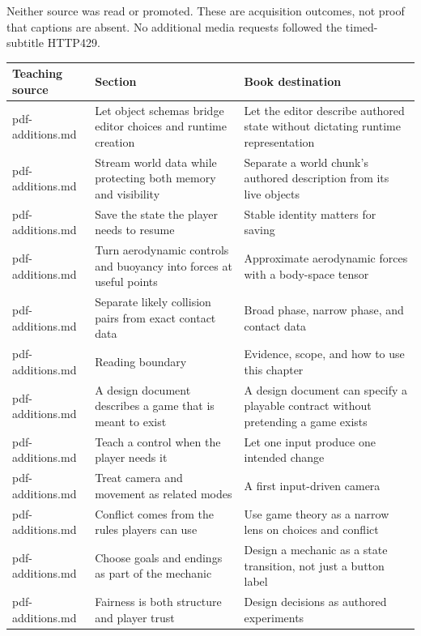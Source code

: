 Neither source was read or promoted. These are acquisition outcomes, not proof that captions are absent. No additional media requests followed the timed-subtitle HTTP429.

{\def\LTcaptype{none} %
\begin{longtable}[]{@{}
  >{\raggedright\arraybackslash}p{}
  >{\raggedright\arraybackslash}p{}
  >{\raggedright\arraybackslash}p{}@{}}
\toprule\noalign{}
\begin{minipage}[b]{\linewidth}\raggedright
Teaching source
\end{minipage} & \begin{minipage}[b]{\linewidth}\raggedright
Section
\end{minipage} & \begin{minipage}[b]{\linewidth}\raggedright
Book destination
\end{minipage} \\
\midrule\noalign{}
\endhead
\bottomrule\noalign{}
\endlastfoot
pdf-additions.md & Let object schemas bridge editor choices and runtime creation & Let the editor describe authored state without dictating runtime representation \\
pdf-additions.md & Stream world data while protecting both memory and visibility & Separate a world chunk's authored description from its live objects \\
pdf-additions.md & Save the state the player needs to resume & Stable identity matters for saving \\
pdf-additions.md & Turn aerodynamic controls and buoyancy into forces at useful points & Approximate aerodynamic forces with a body-space tensor \\
pdf-additions.md & Separate likely collision pairs from exact contact data & Broad phase, narrow phase, and contact data \\
pdf-additions.md & Reading boundary & Evidence, scope, and how to use this chapter \\
pdf-additions.md & A design document describes a game that is meant to exist & A design document can specify a playable contract without pretending a game exists \\
pdf-additions.md & Teach a control when the player needs it & Let one input produce one intended change \\
pdf-additions.md & Treat camera and movement as related modes & A first input-driven camera \\
pdf-additions.md & Conflict comes from the rules players can use & Use game theory as a narrow lens on choices and conflict \\
pdf-additions.md & Choose goals and endings as part of the mechanic & Design a mechanic as a state transition, not just a button label \\
pdf-additions.md & Fairness is both structure and player trust & Design decisions as authored experiments \\
\end{longtable}
}


